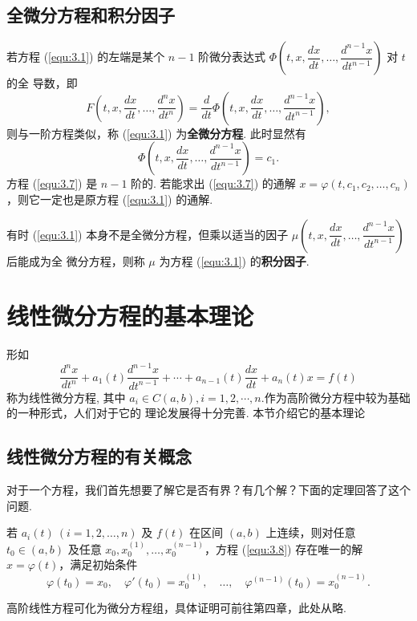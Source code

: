 \subsection{全微分方程和积分因子}
若方程 (\ref{equ:3.1}) 的左端是某个 $n-1$ 阶微分表达式
$\Phi\left(t,x,\dfrac{dx}{dt},\dots,\dfrac{d^{n-1}x}{dt^{n-1}}\right)$ 对 $t$ 的全
导数，即
\begin{equation}\label{equ:3.6}
F\left(t,x,\frac{dx}{dt},\dots,\frac{d^n x}{dt^n}\right)
=\frac{d}{dt}\Phi\left(t,x,\frac{dx}{dt},\dots,\frac{d^{n-1}x}{dt^{n-1}}\right),
\end{equation}
则与一阶方程类似，称 (\ref{equ:3.1}) 为\textbf{全微分方程}. 此时显然有
\begin{equation}\label{equ:3.7}
\Phi\left(t,x,\frac{dx}{dt},\dots,\frac{d^{n-1}x}{dt^{n-1}}\right)=c_1.
\end{equation}
方程 (\ref{equ:3.7}) 是 $n-1$ 阶的. 若能求出 (\ref{equ:3.7}) 的通解
$x=\varphi(t,c_1,c_2,\dots,c_n)$，则它一定也是原方程 (\ref{equ:3.1}) 的通解.

有时 (\ref{equ:3.1}) 本身不是全微分方程，但乘以适当的因子
$\mu\left(t,x,\dfrac{dx}{dt},\dots,\dfrac{d^{n-1}x}{dt^{n-1}}\right)$ 后能成为全
微分方程，则称 $\mu$ 为方程 (\ref{equ:3.1}) 的\textbf{积分因子}.

\section{线性微分方程的基本理论}\label{sec:3.2}
形如
\begin{equation}\label{equ:3.8}
\frac{d^n x}{dt^n}+a_1(t)\frac{d^{n-1}x}{dt^{n-1}}+\cdots
+a_{n-1}(t)\frac{dx}{dt}+a_n(t)x=f(t)
\end{equation}
称为线性微分方程, 其中 $a_i\in C(a,b),i=1,2,\cdots,n$.作为高阶微分方程中较为基础的一种形式，人们对于它的
理论发展得十分完善. 本节介绍它的基本理论

\subsection{线性微分方程的有关概念}
对于一个方程，我们首先想要了解它是否有界？有几个解？下面的定理回答了这个问题.
\begin{thm}\label{thm:3.2.1}
若 $a_i(t)\ (i=1,2,\dots,n)$ 及 $f(t)$ 在区间 $(a,b)$ 上连续，则对任意
$t_0\in(a,b)$ 及任意 $x_0,x_0^{(1)},\dots,x_0^{(n-1)}$，方程 (\ref{equ:3.8})
存在唯一的解 $x=\varphi(t)$，满足初始条件
\[
\varphi(t_0)=x_0,\quad \varphi'(t_0)=x_0^{(1)},\quad\dots,\quad
\varphi^{(n-1)}(t_0)=x_0^{(n-1)}.
\]
\end{thm}
\begin{pf1}
高阶线性方程可化为微分方程组，具体证明可前往第四章，此处从略.
\end{pf1}

